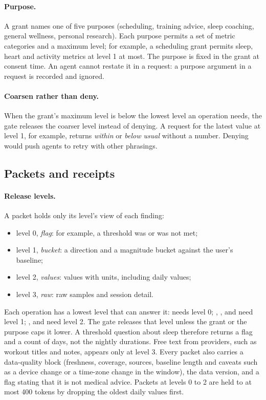 \paragraph{Purpose.} A grant names one of five purposes (scheduling, training advice, sleep coaching, general
wellness, personal research). Each purpose permits a set of metric categories and a maximum level; for example, a
scheduling grant permits sleep, heart and activity metrics at level 1 at most. The purpose is fixed in the grant at
consent time. An agent cannot restate it in a request: a purpose argument in a request is recorded and ignored.

\paragraph{Coarsen rather than deny.} When the grant's maximum level is below the lowest level an operation needs,
the gate releases the coarser level instead of denying. A request for the latest value at level 1, for example,
returns \emph{within} or \emph{below usual} without a number. Denying would push agents to retry with other
phrasings.

\subsection{Packets and receipts}\label{sec:packet}

\paragraph{Release levels.} A packet holds only its level's view of each finding:
\begin{itemize}[leftmargin=1.4em,itemsep=1pt]
\item level 0, \emph{flag}: for example, a threshold was or was not met;
\item level 1, \emph{bucket}: a direction and a magnitude bucket against the user's baseline;
\item level 2, \emph{values}: values with units, including daily values;
\item level 3, \emph{raw}: raw samples and session detail.
\end{itemize}
Each operation has a lowest level that can answer it:  needs level 0; ,
,  and  need level 1; ,
 and  need level 2. The gate releases that level unless the grant or the
purpose caps it lower. A threshold question about sleep therefore returns a flag and a count of days, not the
nightly durations.
Free text from providers, such as workout titles and notes, appears only at level 3. Every packet also carries a
data-quality block (freshness, coverage, sources, baseline length and caveats such as a device change or a
time-zone change in the window), the data version, and a flag stating that it is not medical advice. Packets at
levels 0 to 2 are held to at most 400 tokens by dropping the oldest daily values first.

